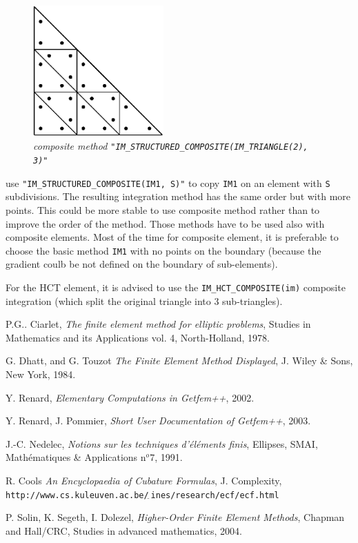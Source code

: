 \documentclass[10pt,a4paper]{article}
\newcommand{\tilda}{{$_{\widetilde{\ }}$}}
\begin{document}
\begin{figure}[H]
  \begin{center}
    \includegraphics[width=5cm,angle=0]{getfemlist_intmethod_triangle2_comp.eps}
  \end{center}
  \caption{ \it composite method {\tt "IM\_STRUCTURED\_COMPOSITE(IM\_TRIANGLE(2), 3)"}} 
  \label{fig:triangle_comp}
\end{figure}


use {\tt "IM\_STRUCTURED\_COMPOSITE(IM1, S)"} to copy {\tt IM1} on an element with {\tt S} subdivisions. The resulting integration method has the same order but with more points. This could be more stable to use composite method rather than to improve the order of the method. Those methods have to be used also with composite elements. Most of the time for composite element, it is preferable to choose the basic method {\tt IM1} with no points on the boundary (because the gradient coulb be not defined on the boundary of sub-elements). 


For the HCT element, it is advised to use the \texttt{IM\_HCT\_COMPOSITE(im)} composite integration (which split the original triangle into 3 sub-triangles).

\begin{thebibliography}{99}


% 
% 
  P.G.. {\sc Ciarlet},
  {\it The finite element method for elliptic problems}, Studies in Mathematics and its Applications vol. 4, North-Holland, 1978.

  G. {\sc Dhatt, and  G. Touzot}
  {\it The Finite Element Method Displayed}, 
 J. Wiley \& Sons,  New York, 1984.

  Y. {\sc Renard},
  {\it Elementary Computations in {\sc Getfem++}}, 2002.

  Y. {\sc Renard}, J. {\sc Pommier},
  {\it Short User Documentation of {\sc Getfem++}}, 2003.

  J.-C. {\sc Nedelec},
  {\it Notions sur les techniques d'{\'e}l{\'e}ments finis}, Ellipses, SMAI, Math{\'e}matiques \& Applications n$^o7$, 1991.

  R. {\sc Cools}
  {\it An Encyclopaedia of Cubature Formulas}, J. Complexity, {\tt http://www.cs.kuleuven.ac.be/\tilda ines/research/ecf/ecf.html}

  P. {\sc Solin, K. Segeth, I. Dolezel},
  {\it Higher-Order Finite Element Methods}, Chapman and Hall/CRC, Studies in advanced mathematics, 2004.


\end{thebibliography}
\end{document}
